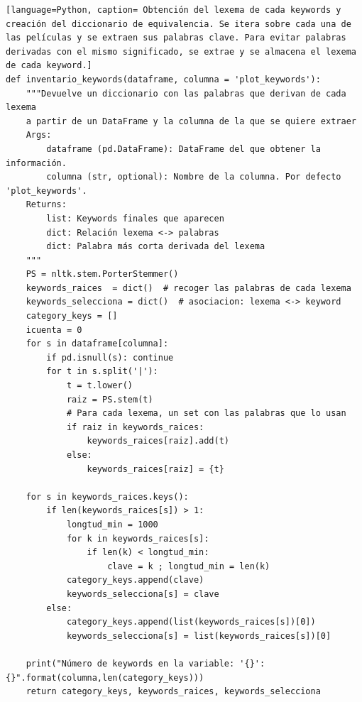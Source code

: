 \begin{lstlisting}[language=Python, caption= Obtención del lexema de cada keywords y creación del diccionario de equivalencia. Se itera sobre cada una de las películas y se extraen sus palabras clave. Para evitar palabras derivadas con el mismo significado, se extrae y se almacena el lexema de cada keyword.]
def inventario_keywords(dataframe, columna = 'plot_keywords'):
    """Devuelve un diccionario con las palabras que derivan de cada lexema
    a partir de un DataFrame y la columna de la que se quiere extraer
    Args:
        dataframe (pd.DataFrame): DataFrame del que obtener la información.
        columna (str, optional): Nombre de la columna. Por defecto 'plot_keywords'.
    Returns:
        list: Keywords finales que aparecen
        dict: Relación lexema <-> palabras
        dict: Palabra más corta derivada del lexema
    """
    PS = nltk.stem.PorterStemmer()
    keywords_raices  = dict()  # recoger las palabras de cada lexema
    keywords_selecciona = dict()  # asociacion: lexema <-> keyword
    category_keys = []
    icuenta = 0
    for s in dataframe[columna]:
        if pd.isnull(s): continue
        for t in s.split('|'):
            t = t.lower()
            raiz = PS.stem(t)
            # Para cada lexema, un set con las palabras que lo usan
            if raiz in keywords_raices:                
                keywords_raices[raiz].add(t)
            else:
                keywords_raices[raiz] = {t}
    
    for s in keywords_raices.keys():
        if len(keywords_raices[s]) > 1:  
            longtud_min = 1000
            for k in keywords_raices[s]:
                if len(k) < longtud_min:
                    clave = k ; longtud_min = len(k)            
            category_keys.append(clave)
            keywords_selecciona[s] = clave
        else:
            category_keys.append(list(keywords_raices[s])[0])
            keywords_selecciona[s] = list(keywords_raices[s])[0]
                   
    print("Número de keywords en la variable: '{}': {}".format(columna,len(category_keys)))
    return category_keys, keywords_raices, keywords_selecciona
\end{lstlisting}

